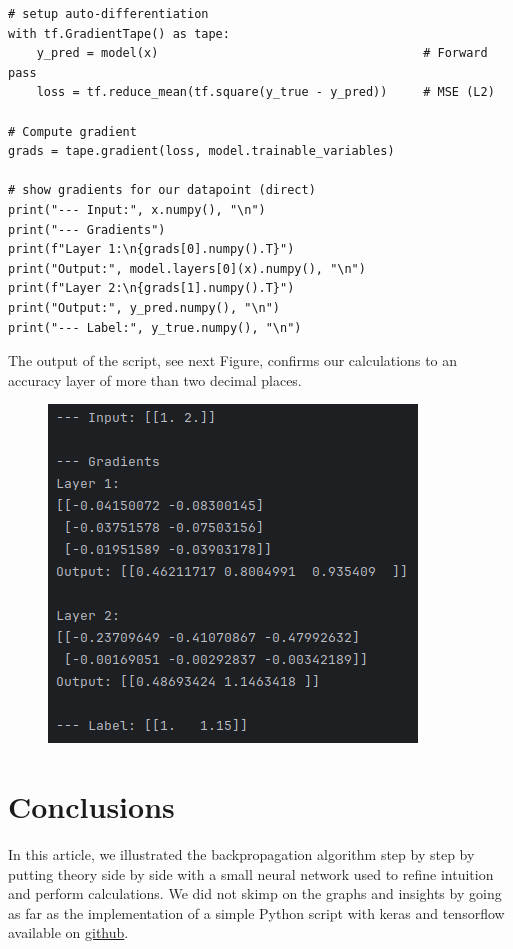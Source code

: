 \documentclass{article}
\begin{document}
\begin{tcolorbox}[colback=gray!10, colframe=gray!50, title=Gradient calculation]
\begin{verbatim}
# setup auto-differentiation
with tf.GradientTape() as tape:
    y_pred = model(x)                                     # Forward pass
    loss = tf.reduce_mean(tf.square(y_true - y_pred))     # MSE (L2)

# Compute gradient
grads = tape.gradient(loss, model.trainable_variables)

# show gradients for our datapoint (direct)
print("--- Input:", x.numpy(), "\n")
print("--- Gradients")
print(f"Layer 1:\n{grads[0].numpy().T}")
print("Output:", model.layers[0](x).numpy(), "\n")
print(f"Layer 2:\n{grads[1].numpy().T}")
print("Output:", y_pred.numpy(), "\n")
print("--- Label:", y_true.numpy(), "\n")
\end{verbatim}
\end{tcolorbox}

The output of the script, see next Figure, confirms our calculations to an accuracy layer of more than two decimal places.

\begin{figure}[H]
    \centering
    \includegraphics[width=0.5\linewidth]{images/output.png}
    
\end{figure}

\section{Conclusions}

In this article, we illustrated the backpropagation algorithm step by step by putting theory side by side with a small neural network used to refine intuition and perform calculations. We did not skimp on the graphs and insights by going as far as the implementation of a simple Python script with keras and tensorflow available on \href{github.com/nicolinux72/backpropagation.git}{github}.

\nocite{*}
\printbibliography
\end{document}
